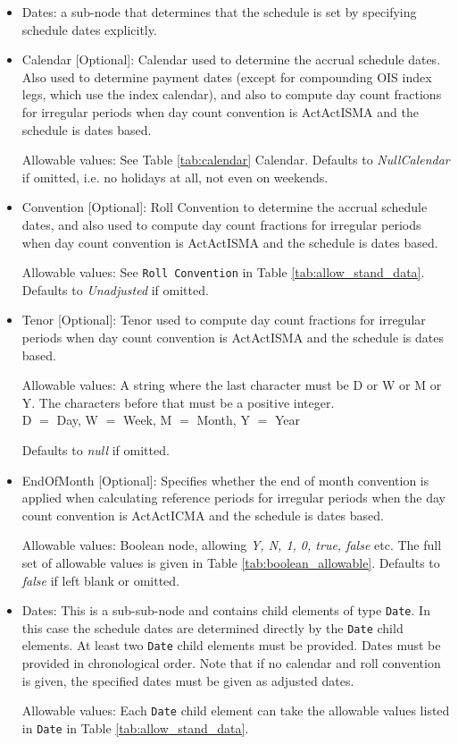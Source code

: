\begin{itemize}

\item Dates: a sub-node that determines that the schedule is set by specifying schedule dates explicitly. 

\item Calendar [Optional]: Calendar used to determine the accrual schedule dates. Also used to determine payment dates (except for compounding OIS index legs, which use the index calendar), and also to compute day count fractions for irregular periods when day count convention is ActActISMA and the schedule is dates based. 

Allowable values: See Table \ref{tab:calendar} Calendar. Defaults to \emph{NullCalendar} if omitted, i.e. no holidays at all, not even on weekends.

\item Convention [Optional]: Roll Convention to determine the accrual schedule dates, and also used to compute day count fractions for irregular periods when day count convention is ActActISMA and the schedule is dates based.

Allowable values: See \lstinline!Roll Convention! in Table
\ref{tab:allow_stand_data}. Defaults to \emph{Unadjusted} if omitted.

\item Tenor [Optional]: Tenor used to compute day count fractions for irregular periods when day count convention is ActActISMA and the schedule is dates based.

Allowable values: A string where the last character must be D or W or
M or Y.  The characters before that must be a positive integer. \\D
$=$ Day, W $=$ Week, M $=$ Month, Y $=$ Year

Defaults to \emph{null} if omitted.

\item EndOfMonth [Optional]: Specifies whether the end of month convention is applied when calculating reference periods
  for irregular periods when the day count convention is ActActICMA and the schedule is dates based.

Allowable values: Boolean node, allowing \emph{Y, N, 1, 0, true, false} etc. The full set of allowable values is given in Table \ref{tab:boolean_allowable}. Defaults to \emph{false} if left blank or omitted.

\item Dates: This is a sub-sub-node and contains child elements of type
  \lstinline!Date!. In this case the schedule dates are determined
  directly by the \lstinline!Date! child elements.  At least two
  \lstinline!Date! child elements must be provided. Dates must be provided in chronological order. Note that if no calendar and roll convention is given, the specified dates must be given as adjusted dates.    

  Allowable values: Each \lstinline!Date!  child element can take the allowable values listed in \lstinline!Date! in
  Table \ref{tab:allow_stand_data}.

\end{itemize}




